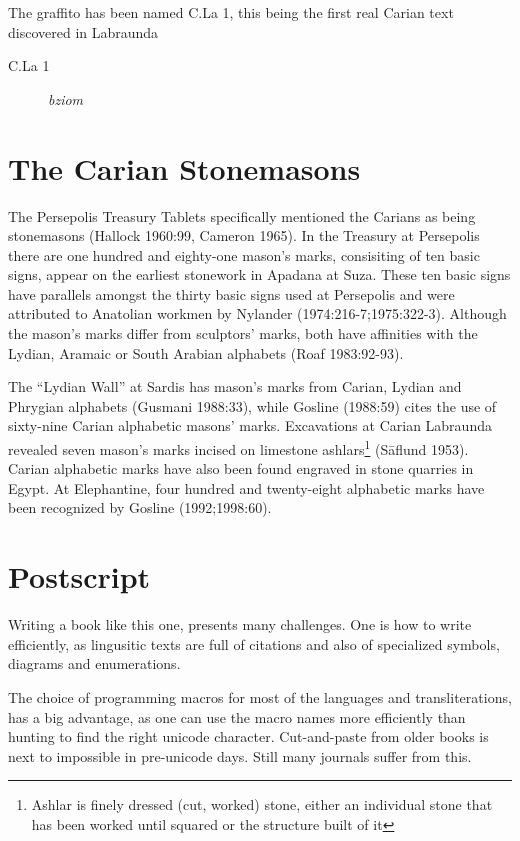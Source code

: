 The graffito has been named C.La 1, this being the first real Carian text discovered in Labraunda
\begin{description}
  \item[C.La 1]  \textit{bziom}
\end{description}

\section{The Carian Stonemasons}

The Persepolis Treasury Tablets specifically mentioned the Carians as being stonemasons (Hallock 1960:99, Cameron 1965). In the Treasury at Persepolis there are one hundred and eighty-one mason's marks, consisiting of ten basic signs, appear on the earliest stonework in Apadana at Suza. These ten basic signs have parallels amongst the thirty basic signs used at Persepolis and were attributed to Anatolian workmen by Nylander (1974:216-7;1975:322-3). Although the mason's marks differ from sculptors' marks, both have affinities with the Lydian, Aramaic or South Arabian alphabets (Roaf 1983:92-93).

The \enquote{Lydian Wall} at Sardis has mason's marks from Carian, Lydian and Phrygian alphabets (Gusmani 1988:33), while Gosline (1988:59) cites the use of sixty-nine Carian alphabetic masons' marks. Excavations at Carian Labraunda revealed seven mason's marks incised on limestone ashlars\footnote{Ashlar is finely dressed (cut, worked) stone, either an individual stone that has been worked until squared or the structure built of it} (S\={a}flund 1953). Carian alphabetic marks have also been found engraved in stone quarries in Egypt. At Elephantine, four hundred and twenty-eight alphabetic marks have been recognized by Gosline (1992;1998:60).


\section{Postscript}

Writing a book like this one, presents many challenges. One is how to write efficiently, as lingusitic texts are full of citations and also of specialized symbols, diagrams and enumerations.

The choice of programming macros for most of the languages and transliterations, has a big advantage, as one can use the macro names more efficiently than hunting to find the right unicode character. Cut-and-paste from older books is next to impossible in pre-unicode days. Still many journals suffer from this. 